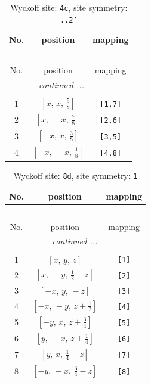 \documentclass[fleqn,8pt]{jsarticle}
\begin{document}
\renewcommand{\arraystretch}{1.2}
\begin{longtable}{ccc}
\caption{Wyckoff site: {\tt 4c}, site symmetry: {\tt ..2'}}
 \\
 \hline \hline
No. & position & mapping \\ \hline \endfirsthead

\multicolumn{2}{l}{\tablename\ \thetable{}} \\
 \hline \hline
No. & position & mapping \\ \hline \endhead

 \hline \hline
\multicolumn{2}{r}{\footnotesize\it continued ...} \\ \endfoot

 \hline \hline
\multicolumn{2}{r}{} \\ \endlastfoot

1 & $\left[ x,\, x,\, \frac{5}{8} \right]$ & {\tt [1,7]} \\ \hline
2 & $\left[ x,\, - x,\, \frac{7}{8} \right]$ & {\tt [2,6]} \\ \hline
3 & $\left[ - x,\, x,\, \frac{3}{8} \right]$ & {\tt [3,5]} \\ \hline
4 & $\left[ - x,\, - x,\, \frac{1}{8} \right]$ & {\tt [4,8]} \\
\end{longtable}
\renewcommand{\arraystretch}{1.2}
\begin{longtable}{ccc}
\caption{Wyckoff site: {\tt 8d}, site symmetry: {\tt 1}}
 \\
 \hline \hline
No. & position & mapping \\ \hline \endfirsthead

\multicolumn{2}{l}{\tablename\ \thetable{}} \\
 \hline \hline
No. & position & mapping \\ \hline \endhead

 \hline \hline
\multicolumn{2}{r}{\footnotesize\it continued ...} \\ \endfoot

 \hline \hline
\multicolumn{2}{r}{} \\ \endlastfoot

1 & $\left[ x,\, y,\, z \right]$ & {\tt [1]} \\ \hline
2 & $\left[ x,\, - y,\, \frac{1}{2} - z \right]$ & {\tt [2]} \\ \hline
3 & $\left[ - x,\, y,\, - z \right]$ & {\tt [3]} \\ \hline
4 & $\left[ - x,\, - y,\, z + \frac{1}{2} \right]$ & {\tt [4]} \\ \hline
5 & $\left[ - y,\, x,\, z + \frac{3}{4} \right]$ & {\tt [5]} \\ \hline
6 & $\left[ y,\, - x,\, z + \frac{1}{4} \right]$ & {\tt [6]} \\ \hline
7 & $\left[ y,\, x,\, \frac{1}{4} - z \right]$ & {\tt [7]} \\ \hline
8 & $\left[ - y,\, - x,\, \frac{3}{4} - z \right]$ & {\tt [8]} \\
\end{longtable}
\end{document}
